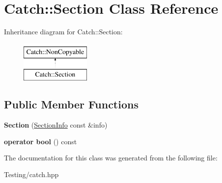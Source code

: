 \hypertarget{class_catch_1_1_section}{\section{Catch\-:\-:Section Class Reference}
\label{class_catch_1_1_section}
}
Inheritance diagram for Catch\-:\-:Section\-:\begin{figure}[H]
\begin{center}
\leavevmode
\includegraphics[height=2.000000cm]{class_catch_1_1_section}
\end{center}
\end{figure}
\subsection*{Public Member Functions}
\begin{DoxyCompactItemize}
\item 
\hypertarget{class_catch_1_1_section_a68fd4e51e8981aaa7ddb00d8a6abd099}{{\bfseries Section} (\hyperlink{struct_catch_1_1_section_info}{Section\-Info} const \&info)}\label{class_catch_1_1_section_a68fd4e51e8981aaa7ddb00d8a6abd099}

\item 
\hypertarget{class_catch_1_1_section_a6c9be48e8ba0611c4aa601102e706f3b}{{\bfseries operator bool} () const }\label{class_catch_1_1_section_a6c9be48e8ba0611c4aa601102e706f3b}

\end{DoxyCompactItemize}


The documentation for this class was generated from the following file\-:\begin{DoxyCompactItemize}
\item 
Testing/catch.\-hpp\end{DoxyCompactItemize}
